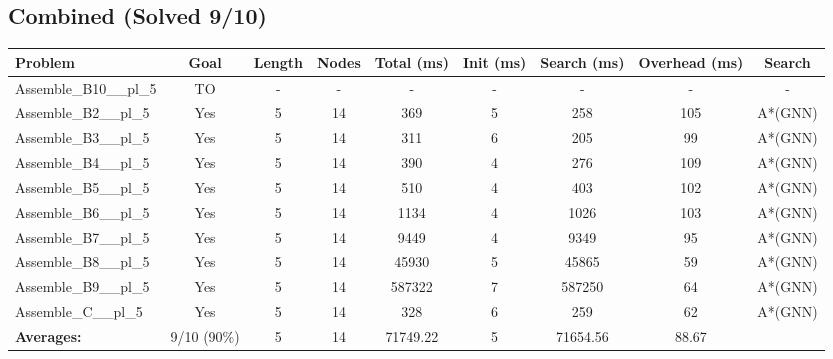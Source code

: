 \documentclass{article}
\begin{document}
\subsection*{Combined (Solved 9/10)}
\begin{tabular}{lcccccccc}
\toprule
Problem & Goal & Length & Nodes & Total (ms) & Init (ms) & Search (ms) & Overhead (ms) & Search \\
\midrule
Assemble\_B10\_\_pl\_5 & TO & - & - & - & - & - & - & - \\
Assemble\_B2\_\_pl\_5 & Yes & 5 & 14 & 369 & 5 & 258 & 105 & A*(GNN) \\
Assemble\_B3\_\_pl\_5 & Yes & 5 & 14 & 311 & 6 & 205 & 99 & A*(GNN) \\
Assemble\_B4\_\_pl\_5 & Yes & 5 & 14 & 390 & 4 & 276 & 109 & A*(GNN) \\
Assemble\_B5\_\_pl\_5 & Yes & 5 & 14 & 510 & 4 & 403 & 102 & A*(GNN) \\
Assemble\_B6\_\_pl\_5 & Yes & 5 & 14 & 1134 & 4 & 1026 & 103 & A*(GNN) \\
Assemble\_B7\_\_pl\_5 & Yes & 5 & 14 & 9449 & 4 & 9349 & 95 & A*(GNN) \\
Assemble\_B8\_\_pl\_5 & Yes & 5 & 14 & 45930 & 5 & 45865 & 59 & A*(GNN) \\
Assemble\_B9\_\_pl\_5 & Yes & 5 & 14 & 587322 & 7 & 587250 & 64 & A*(GNN) \\
Assemble\_C\_\_pl\_5 & Yes & 5 & 14 & 328 & 6 & 259 & 62 & A*(GNN) \\
\textbf{Averages:} & 9/10 (90\%) & 5 & 14 & 71749.22 & 5 & 71654.56 & 88.67 & \\
\bottomrule
\end{tabular}
\\[0.7cm]
\end{document}
